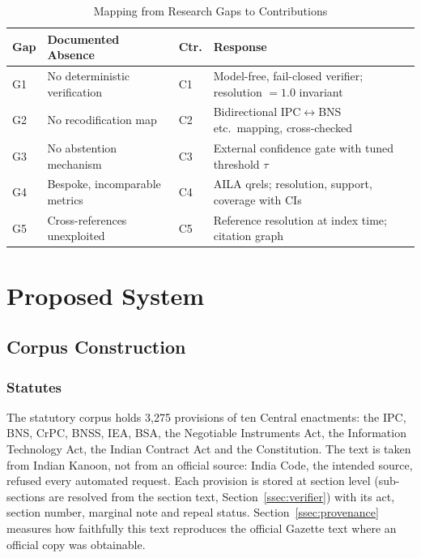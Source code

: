 \documentclass[conference]{IEEEtran}
\begin{document}
\begin{table}[t]
\caption{Mapping from Research Gaps to Contributions}
\label{tab:gaps}
\centering
\footnotesize
\begin{tabular}{@{}p{0.6cm}p{3.0cm}p{0.6cm}p{3.1cm}@{}}
\toprule
\textbf{Gap} & \textbf{Documented Absence} & \textbf{Ctr.} & \textbf{Response} \\
\midrule
G1 & No deterministic verification & C1 & Model-free, fail-closed verifier; resolution $=1.0$ invariant \\
\addlinespace
G2 & No recodification map & C2 & Bidirectional IPC$\leftrightarrow$BNS etc.\ mapping, cross-checked \\
\addlinespace
G3 & No abstention mechanism & C3 & External confidence gate with tuned threshold $\tau$ \\
\addlinespace
G4 & Bespoke, incomparable metrics & C4 & AILA qrels; resolution, support, coverage with CIs \\
\addlinespace
G5 & Cross-references unexploited & C5 & Reference resolution at index time; citation graph \\
\bottomrule
\end{tabular}
\end{table}

\section{Proposed System}

\subsection{Corpus Construction}

\subsubsection{Statutes} The statutory corpus holds 3,275 provisions of ten Central enactments: the IPC, BNS, CrPC, BNSS, IEA, BSA, the Negotiable Instruments Act, the Information Technology Act, the Indian Contract Act and the Constitution. The text is taken from Indian Kanoon, not from an official source: India Code, the intended source, refused every automated request. Each provision is stored at section level (sub-sections are resolved from the section text, Section~\ref{ssec:verifier}) with its act, section number, marginal note and repeal status. Section~\ref{ssec:provenance} measures how faithfully this text reproduces the official Gazette text where an official copy was obtainable.
\end{document}
